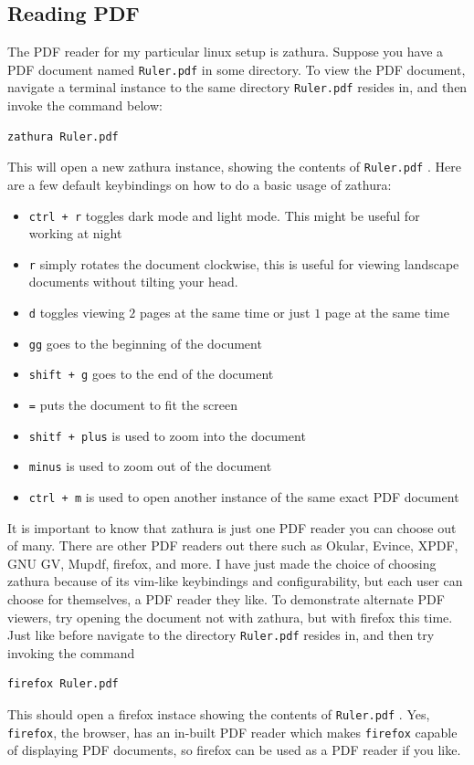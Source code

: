 \documentclass[a4paper, 12pt]{report}
\begin{document}
\begin{center}
\subsection{Reading PDF}

The PDF reader for my particular linux setup is zathura. Suppose you have a PDF document named \texttt{Ruler.pdf} in some directory. To view the PDF document, navigate a terminal instance to the same directory \texttt{Ruler.pdf} resides in, and then invoke the command below:
\begin{lstlisting}
zathura Ruler.pdf
\end{lstlisting}
This will open a new zathura instance, showing the contents of \texttt{Ruler.pdf} . Here are a few default keybindings on how to do a basic usage of zathura:
\begin{itemize}
\item \texttt{ctrl + r} toggles dark mode and light mode. This might be useful for working at night
\item \texttt{r} simply rotates the document clockwise, this is useful for viewing landscape documents without tilting your head.
\item \texttt{d} toggles viewing $2$ pages at the same time or just $1$ page at the same time
\item \texttt{gg} goes to the beginning of the document
\item \texttt{shift + g} goes to the end of the document
\item \texttt{=} puts the document to fit the screen
\item \texttt{shitf + plus} is used to zoom into the document
\item \texttt{minus} is used to zoom out of the document
\item \texttt{ctrl + m} is used to open another instance of the same exact PDF document
\end{itemize}
It is important to know that zathura is just one PDF reader you can choose out of many. There are other PDF readers out there such as Okular, Evince, XPDF, GNU GV, Mupdf, firefox, and more. I have just made the choice of choosing zathura because of its vim-like keybindings and configurability, but each user can choose for themselves, a PDF reader they like. To demonstrate alternate PDF viewers, try opening the document not with zathura, but with firefox this time. Just like before navigate to the directory \texttt{Ruler.pdf} resides in, and then try invoking the command
\begin{lstlisting}
firefox Ruler.pdf
\end{lstlisting}
This should open a firefox instace showing the contents of \texttt{Ruler.pdf} . Yes, \texttt{firefox}, the browser, has an in-built PDF reader which makes \texttt{firefox} capable of displaying PDF documents, so firefox can be used as a PDF reader if you like.


\end{center}
\end{document}
